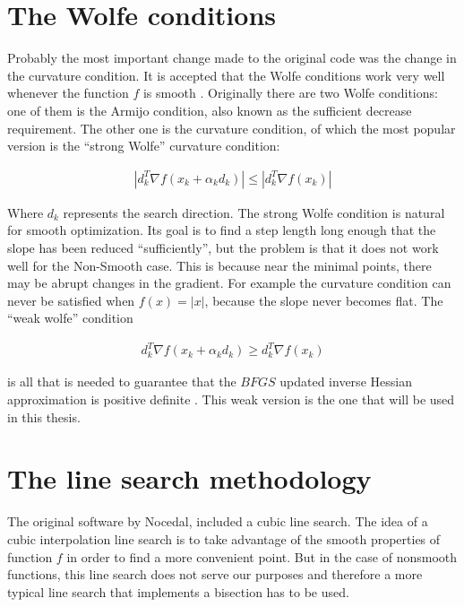\section{The Wolfe conditions}

Probably the most important change made to the original code was the change in the curvature condition. It is accepted that the Wolfe conditions work very well whenever the function $f$ is smooth \citep{MR1855221}. Originally there are two Wolfe conditions: one of them is the Armijo condition, also known as the sufficient decrease requirement. The other one is the curvature condition, of which the most popular version is the ``strong Wolfe'' curvature condition:

\begin{equation}
  \begin{aligned}
    |d_k^T \nabla f(x_k + \alpha _k d_k)| \leq |d_k^T \nabla f(x_k)|
  \end{aligned}
\end{equation}

Where $d_k$ represents the search direction. The strong Wolfe condition is natural for smooth optimization. Its goal is to find a step length long enough that the slope has been reduced ``sufficiently'', but the problem is that it does not work well for the Non-Smooth case. This is because near the minimal points, there may be abrupt changes in the gradient. For example the curvature condition can never be satisfied when $f(x) = |x|$, because the slope never becomes flat. The ``weak wolfe'' condition

\begin{equation}
  \begin{aligned}
    d_k^T \nabla f(x_k + \alpha _k d_k) \geq d_k^T \nabla f(x_k)
  \end{aligned}
\end{equation}

is all that is needed to guarantee that the $BFGS$ updated inverse Hessian approximation is positive definite \citep{overtonlewis}. This weak version is the one that will be used in this thesis.

\section{The line search methodology}

The original software by Nocedal\citep{lbfgsbsoftware}, included a cubic line search. The idea of a cubic interpolation line search is to take advantage of the smooth properties of function $f$ in order to find a more convenient point. But in the case of nonsmooth functions, this line search does not serve our purposes and therefore a more typical line search that implements a bisection has to be used.

